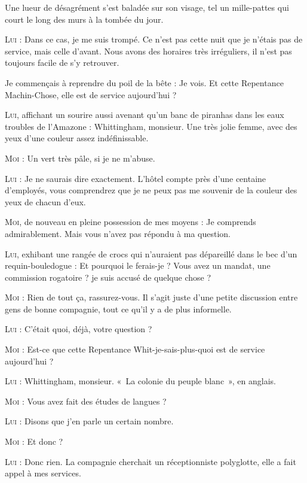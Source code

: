 Une lueur de désagrément s’est baladée sur son visage, tel un mille-pattes qui court le long des murs à la tombée du jour.

\begin{dialogue}

\textsc{Lui} : Dans ce cas, je me suis trompé. Ce n’est pas cette nuit que je n’étais pas de service, mais celle d’avant. Nous avons des horaires très irréguliers, il n’est pas toujours facile de s’y retrouver.

Je commençais à reprendre du poil de la bête : Je vois. Et cette Repentance Machin-Chose, elle est de service aujourd’hui ?

\textsc{Lui}, affichant un sourire aussi avenant qu’un banc de piranhas dans les eaux troubles de l’Amazone : Whittingham, monsieur. Une très jolie femme, avec des yeux d’une couleur assez indéfinissable.

\textsc{Moi} : Un vert très pâle, si je ne m’abuse.

\textsc{Lui} : Je ne saurais dire exactement. L’hôtel compte près d’une centaine d’employés, vous comprendrez que je ne peux pas me souvenir de la couleur des yeux de chacun d’eux.

\textsc{Moi}, de nouveau en pleine possession de mes moyens : Je comprends admirablement. Mais vous n’avez pas répondu à ma question.

\textsc{Lui}, exhibant une rangée de crocs qui n’auraient pas dépareillé dans le bec d’un requin-bouledogue : Et pourquoi le ferais-je ? Vous avez un mandat, une commission rogatoire ? je suis accusé de quelque chose ?

\textsc{Moi} : Rien de tout ça, rassurez-vous. Il s’agit juste d’une petite discussion entre gens de bonne compagnie, tout ce qu’il y a de plus informelle.

\textsc{Lui} : C’était quoi, déjà, votre question ?

\textsc{Moi} : Est-ce que cette Repentance Whit-je-sais-plus-quoi est de service aujourd’hui ?

\textsc{Lui} : Whittingham, monsieur. «~La colonie du peuple blanc~», en anglais.

\textsc{Moi} : Vous avez fait des études de langues ?

\textsc{Lui} : Disons que j’en parle un certain nombre.

\textsc{Moi} : Et donc ?

\textsc{Lui} : Donc rien. La compagnie cherchait un réceptionniste polyglotte, elle a fait appel à mes services.


\end{dialogue}
